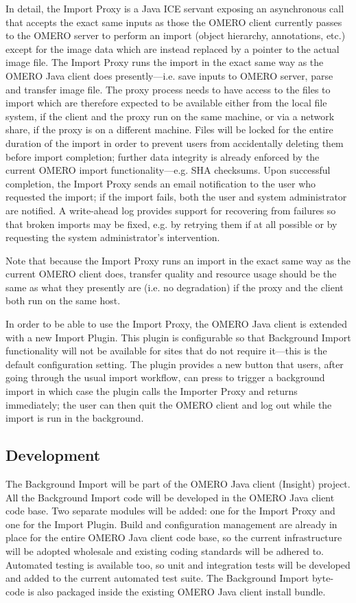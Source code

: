 In detail, the Import Proxy is a Java ICE servant exposing an asynchronous call that 
accepts the exact same inputs as those the OMERO client currently passes to the OMERO
server to perform an import (object hierarchy, annotations, etc.) except for the image
data which are instead replaced by a pointer to the actual image file. 
The Import Proxy runs the import in the exact same way as the OMERO Java client does 
presently---i.e. save inputs to OMERO server, parse and transfer image file. 
The proxy process needs to have access to the files to import which are therefore 
expected to be available either from the local file system, if the client and the 
proxy run on the same machine, or via a network share, if the proxy is on a different
machine.
Files will be locked for the entire duration of the import in order to prevent users
from accidentally deleting them before import completion; further data integrity is 
already enforced by the current OMERO import functionality---e.g. SHA checksums. 
Upon successful completion, the Import Proxy sends an email notification to the user
who requested the import; if the import fails, both the user and system administrator
are notified. A write-ahead log provides support for recovering from failures so
that broken imports may be fixed, e.g. by retrying them if at all possible or by
requesting the system administrator's intervention.

Note that because the Import Proxy runs an import in the exact same way as the 
current OMERO client does, transfer quality and resource usage should be the same 
as what they presently are (i.e. no degradation) if the proxy and the client both
run on the same host.

In order to be able to use the Import Proxy, the OMERO Java client is extended with
a new Import Plugin. This plugin is configurable so that Background Import functionality 
will not be available for sites that do not require it---this is the default 
configuration setting. The plugin provides a new button that users, after going 
through the usual import workflow, can press to trigger a background import in which
case the plugin calls the Importer Proxy and returns immediately; the user can then 
quit the OMERO client and log out while the import is run in the background.


\subsection{Development}
The Background Import will be part of the OMERO Java client (Insight) project. All 
the Background Import code will be developed in the OMERO Java client code base. Two 
separate modules will be added: one for the Import Proxy and one for the Import Plugin.
Build and configuration management are already in place for the entire OMERO Java client
code base, so the current infrastructure will be adopted wholesale and existing coding 
standards will be adhered to. 
Automated testing is available too, so unit and integration tests will be developed and
added to the current automated test suite.  
The Background Import byte-code is also packaged inside the existing OMERO Java client 
install bundle.

